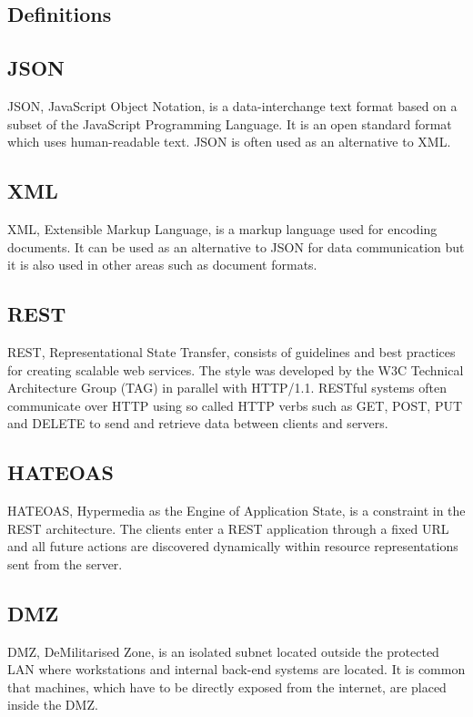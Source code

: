 \documentclass{cslthse-msc}
\begin{document}
\begin{appendices}
\chapter{Definitions}
\section{JSON}
JSON, JavaScript Object Notation, is a data-interchange text format based on a subset of the JavaScript Programming Language. It is an open standard format which uses human-readable text. JSON is often used as an alternative to XML.

\section{XML}
XML, Extensible Markup Language, is a markup language used for encoding documents. It can be used as an alternative to JSON for data communication but it is also used in other areas such as document formats.

\section{REST}
REST, Representational State Transfer, consists of guidelines and best practices for creating scalable web services. The style was developed by the W3C Technical Architecture Group (TAG) in parallel with HTTP/1.1. RESTful systems often communicate over HTTP using so called HTTP verbs such as GET, POST, PUT and DELETE to send and retrieve data between clients and servers.

\section{HATEOAS}
HATEOAS, Hypermedia as the Engine of Application State, is a constraint in the REST architecture. The clients enter a REST application through a fixed URL and all future actions are discovered dynamically within resource representations sent from the server.

\section{DMZ}
DMZ, DeMilitarised  Zone, is an isolated subnet located outside the protected LAN where workstations and internal back-end systems are located. It is common that machines, which have to be directly exposed from the internet, are placed inside the DMZ.


\end{appendices}
\end{document}
